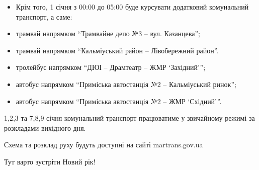 \begin{itemize}
  \item Крім того, 1 січня з 00:00 до 05:00 буде курсувати додатковий комунальний транспорт, а саме:
  \item трамвай напрямком \enquote{Трамвайне депо №3 – вул. Казанцева};
  \item трамвай напрямком \enquote{Кальміуський район – Лівобережний район}.
  \item тролейбус напрямком \enquote{ДЮІ – Драмтеатр – ЖМР \enquote{Західний}};
  \item автобус напрямком \enquote{Приміська автостанція №2 – Кальміуський ринок};
  \item автобус напрямком \enquote{Приміська автостанція №2 – ЖМР \enquote{Східний}}.
\end{itemize}

1,2,3 та 7,8,9 січня комунальний транспорт працюватиме у звичайному режимі за
розкладами вихідного дня.

Схема та розклад руху будуть доступні на сайті martrans.gov.ua

Тут варто зустріти Новий рік!
